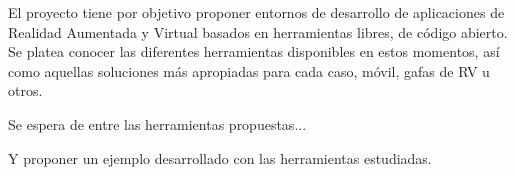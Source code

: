 
El proyecto tiene por objetivo proponer entornos de desarrollo de aplicaciones de Realidad Aumentada y Virtual basados en herramientas libres, de código abierto. Se platea conocer las diferentes herramientas disponibles en estos momentos, así como aquellas soluciones más apropiadas para cada caso, móvil, gafas de RV u otros.

Se espera de entre las herramientas propuestas...

Y proponer un ejemplo desarrollado con las herramientas estudiadas.